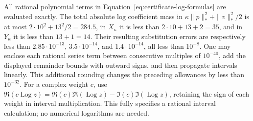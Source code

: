 All rational polynomial terms in Equation~\eqref{eq:certificate-log-formulas}
are evaluated exactly.  The total absolute log coefficient mass in
$\kappa\|p\|_*^2+\|v\|_*^2/2$ is at most
$2\cdot10^2+13^2/2=284.5$, in $X_\kappa$ it is less than
$2\cdot10+13+2=35$, and in $Y_\kappa$ it is less than $13+1=14$.
Their resulting substitution errors are respectively less than
$2.85\cdot10^{-13}$, $3.5\cdot10^{-14}$, and $1.4\cdot10^{-14}$,
all less than $10^{-8}$.
One may enclose each rational series term between consecutive multiples
of $10^{-40}$, add the displayed remainder bounds with outward signs,
and then propagate intervals linearly.  This additional rounding changes
the preceding allowances by less than $10^{-32}$.
For a complex weight $c$, use
$\Re(c\operatorname{Log}z)=\Re(c)\Re(\operatorname{Log}z)
-\Im(c)\Im(\operatorname{Log}z)$, retaining the sign of each weight in
interval multiplication.  This fully specifies a rational interval
calculation; no numerical logarithms are needed.

